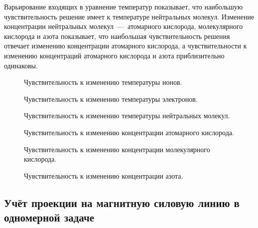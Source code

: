 \documentclass[14pt, a4paper, fleqn]{extarticle}
\begin{document}
\medskip

Варьирование входящих в уравнение температур показывает, что наибольшую чувствительность решение имеет к температуре нейтральных молекул. Изменение концентрации нейтральных молекул~---~атомарного кислорода, молекулярного кислорода и азота показывает, что наибольшая чувствительность решения отвечает изменению концентрации атомарного кислорода, а чувствительности к изменению концентраций атомарного кислорода и азота приблизительно одинаковы.

\medskip

\begin{figure}
\caption{Чувствительность к изменению температуры ионов.}
\end{figure}

\begin{figure}
\caption{Чувствительность к изменению температуры электронов.}
\end{figure}

\begin{figure}
\caption{Чувствительность к изменению температуры нейтральных молекул.}
\end{figure}

\begin{figure}
\caption{Чувствительность к изменению концентрации атомарного кислорода.}
\end{figure}

\begin{figure}
\caption{Чувствительность к изменению концентрации молекулярного кислорода.}
\end{figure}

\begin{figure}
\caption{Чувствительность к изменению концентрации азота.}
\end{figure}

\newpage

\subsection{Учёт проекции на магнитную силовую линию в одномерной задаче}
\end{document}
